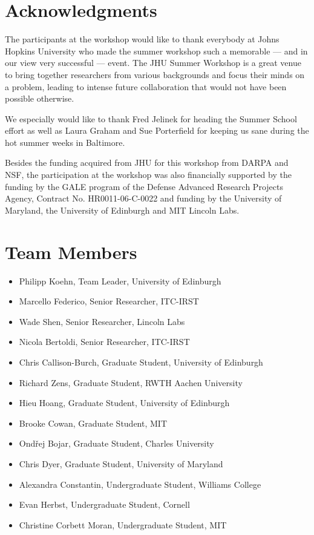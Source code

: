 \documentclass[11pt]{report}
\theoremstyle{plain}
\begin{document}
\section*{Acknowledgments}
{\Large
The participants at the workshop would like to thank everybody at Johns Hopkins University who made the summer workshop such a memorable --- and in our view very successful --- event. The JHU Summer Workshop is a great venue to bring together researchers from various backgrounds and focus their minds on a problem, leading to intense future collaboration that would not have been possible otherwise.

We especially would like to thank Fred Jelinek for heading the Summer School effort as well as Laura Graham and Sue Porterfield for keeping us sane during the hot summer weeks in Baltimore.

Besides the funding acquired from JHU for this workshop from DARPA and NSF, the participation at the workshop was also financially supported by the funding by the GALE program of the Defense Advanced Research Projects Agency, Contract No. HR0011-06-C-0022 and funding by the University of Maryland, the University of Edinburgh and MIT Lincoln Labs.

\phantom{.}}

\newpage
\section*{Team Members}

{\Large
\begin{itemize}
\item Philipp Koehn, Team Leader, University of Edinburgh
\item Marcello Federico, Senior Researcher, ITC-IRST
\item Wade Shen, Senior Researcher, Lincoln Labs
\item Nicola Bertoldi, Senior Researcher, ITC-IRST
\item Chris Callison-Burch, Graduate Student, University of Edinburgh
\item Richard Zens, Graduate Student, RWTH Aachen University
\item Hieu Hoang, Graduate Student, University of Edinburgh
\item Brooke Cowan, Graduate Student, MIT
\item Ond\v{r}ej Bojar, Graduate Student, Charles University
\item Chris Dyer, Graduate Student, University of Maryland
\item Alexandra Constantin, Undergraduate Student, Williams College
\item Evan Herbst, Undergraduate Student, Cornell
\item Christine Corbett Moran, Undergraduate Student, MIT
\end{itemize}
}
\end{document}
